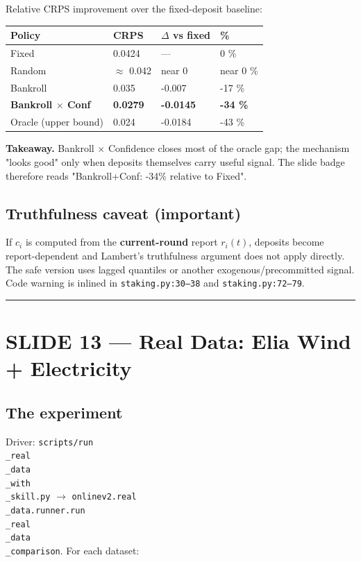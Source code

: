 \documentclass[11pt]{article}
\begin{document}
Relative CRPS improvement over the fixed-deposit baseline:

\begin{center}
\begin{tabular}{llll}
\toprule
Policy & CRPS & $\Delta$ vs fixed & \% \\
\midrule
Fixed & 0.0424 & --- & 0 \% \\
Random & $\approx$ 0.042 & near 0 & near 0 \% \\
Bankroll & 0.035 & -0.007 & -17 \% \\
\textbf{Bankroll $\times$ Conf} & \textbf{0.0279} & \textbf{-0.0145} & \textbf{-34 \%} \\
Oracle (upper bound) & 0.024 & -0.0184 & -43 \% \\
\bottomrule
\end{tabular}
\end{center}

\textbf{Takeaway.} Bankroll $\times$ Confidence closes most of the oracle gap; the mechanism "looks good" only when deposits themselves carry useful signal. The slide badge therefore reads "Bankroll+Conf: -34\% relative to Fixed".

\subsection{Truthfulness caveat (important)}


If $c_i$ is computed from the \textbf{current-round} report $r_i(t)$, deposits become report-dependent and Lambert's truthfulness argument does not apply directly. The safe version uses lagged quantiles or another exogenous/precommitted signal. Code warning is inlined in \texttt{staking.py:30--38} and \texttt{staking.py:72--79}.

\bigskip\hrule\bigskip

\section{SLIDE 13 --- Real Data: Elia Wind + Electricity}


\subsection{The experiment}


Driver: \texttt{scripts/run\\_real\\_data\\_with\\_skill.py} $\rightarrow$ \texttt{onlinev2.real\\_data.runner.run\\_real\\_data\\_comparison}. For each dataset:
\end{document}
